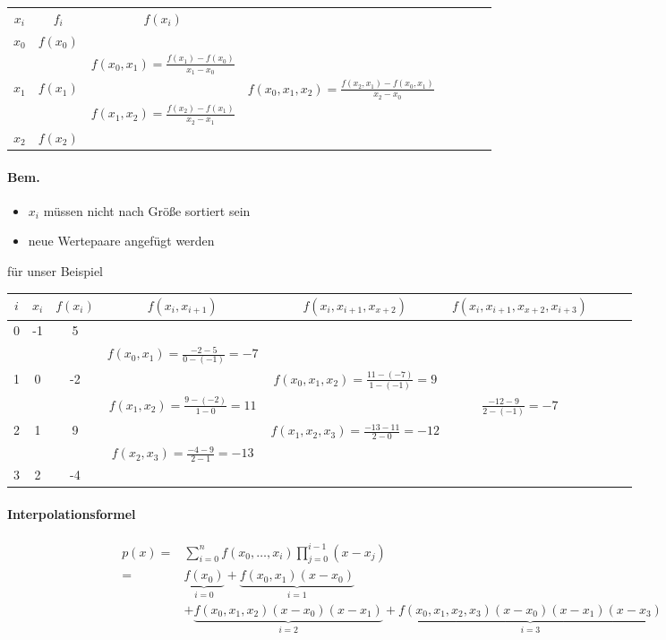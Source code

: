\documentclass[a4paper,ngerman]{scrbook}
\begin{document}
\begin{tabular}{c|c|cccccc}
  $x_i$ & $f_i$  & $f(x_i)$\\\cline{1-3}
  $x_0$ & $f(x_0)$\\
  & & $f(x_0,x_1) = \frac{f(x_1) - f(x_0)}{x_1 - x_0}$\\
  $x_1$ & $f(x_1)$ & & $f(x_0, x_1, x_2) = \frac{f(x_2,x_1) - f(x_0,x_1)}{x_2-x_0}$\\
  & & $f(x_1,x_2) = \frac{f(x_2) - f(x_1)}{x_2 - x_1}$\\
  $x_2$ & $f(x_2)$
\end{tabular}

\paragraph{Bem.}

\begin{itemize}
\item $x_i$ müssen nicht nach Größe sortiert sein
\item neue Wertepaare angefügt werden
\end{itemize}

für unser Beispiel

\begin{tabular}{c|c|c|cccccc}
  $i$ & $x_i$ & $f(x_i)$ & $f(x_i,x_{i+1})$ & $f(x_i,x_{i+1},x_{x+2})$ & $f(x_i,x_{i+1},x_{x+2},x_{i+3})$\\\hline
  0 &  -1 & 5\\
  & & & $f(x_0,x_1) = \frac{-2-5}{0-(-1)} = -7$\\
  1 & 0 & -2 & & $f(x_0,x_1,x_2) = \frac{11-(-7)}{1-(-1)} = 9$\\
  & & & $f(x_1,x_2) = \frac{9-(-2)}{1-0} = 11$ & & $\frac{-12-9}{2-(-1)} = -7$\\
  2 & 1 & 9 & & $f(x_1,x_2,x_3) = \frac{-13-11}{2-0} = -12$\\
  & & & $f(x_2,x_3) = \frac{-4 -9}{2-1} = -13$\\
  3 & 2 & -4
\end{tabular}

\paragraph{Interpolationsformel}

\begin{align*}
  p(x) =& \sum_{i=0}^n f(x_0,\dots,x_i)\prod_{j=0}^{i-1} (x-x_j)\\
  =& \underbrace{f(x_0)}_{i=0} + \underbrace{f(x_0,x_1)(x-x_0)}_{i=1}\\
&+ \underbrace{f(x_0,x_1,x_2)(x-x_0)(x-x_1)}_{i=2} + \underbrace{f(x_0,x_1,x_2,x_3)(x-x_0)(x-x_1)(x-x_3)}_{i=3}
\end{align*}
\end{document}
